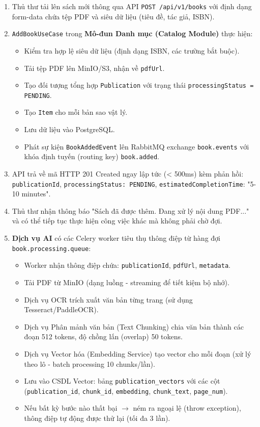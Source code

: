 \begin{enumerate}
    \item Thủ thư tải lên sách mới thông qua API \texttt{POST /api/v1/books} với định dạng form-data chứa tệp PDF và siêu dữ liệu (tiêu đề, tác giả, ISBN).
    
    \item \texttt{AddBookUseCase} trong \textbf{Mô-đun Danh mục (Catalog Module)} thực hiện:
    \begin{itemize}
        \item Kiểm tra hợp lệ siêu dữ liệu (định dạng ISBN, các trường bắt buộc).
        \item Tải tệp PDF lên MinIO/S3, nhận về \texttt{pdfUrl}.
        \item Tạo đối tượng tổng hợp \texttt{Publication} với trạng thái \texttt{processingStatus = PENDING}.
        \item Tạo \texttt{Item} cho mỗi bản sao vật lý.
        \item Lưu dữ liệu vào PostgreSQL.
        \item Phát sự kiện \texttt{BookAddedEvent} lên RabbitMQ exchange \texttt{book.events} với khóa định tuyến (routing key) \texttt{book.added}.
    \end{itemize}
    
    \item API trả về mã HTTP 201 Created ngay lập tức (< 500ms) kèm phản hồi: \texttt{publicationId}, \texttt{processingStatus: PENDING}, \texttt{estimatedCompletionTime}: "5-10 minutes".
    
    \item Thủ thư nhận thông báo "Sách đã được thêm. Đang xử lý nội dung PDF..." và có thể tiếp tục thực hiện công việc khác mà không phải chờ đợi.
    
    \item \textbf{Dịch vụ AI} có các Celery worker tiêu thụ thông điệp từ hàng đợi \texttt{book.processing.queue}:
    \begin{itemize}
        \item Worker nhận thông điệp chứa: \texttt{publicationId}, \texttt{pdfUrl}, \texttt{metadata}.
        \item Tải PDF từ MinIO (dạng luồng - streaming để tiết kiệm bộ nhớ).
        \item Dịch vụ OCR trích xuất văn bản từng trang (sử dụng Tesseract/PaddleOCR).
        \item Dịch vụ Phân mảnh văn bản (Text Chunking) chia văn bản thành các đoạn 512 tokens, độ chồng lấn (overlap) 50 tokens.
        \item Dịch vụ Vector hóa (Embedding Service) tạo vector cho mỗi đoạn (xử lý theo lô - batch processing 10 chunks/lần).
        \item Lưu vào CSDL Vector: bảng \texttt{publication\_vectors} với các cột (\texttt{publication\_id}, \texttt{chunk\_id}, \texttt{embedding}, \texttt{chunk\_text}, \texttt{page\_num}).
        \item Nếu bất kỳ bước nào thất bại $\rightarrow$ ném ra ngoại lệ (throw exception), thông điệp tự động được thử lại (tối đa 3 lần).
    \end{itemize}
    

\end{enumerate}
